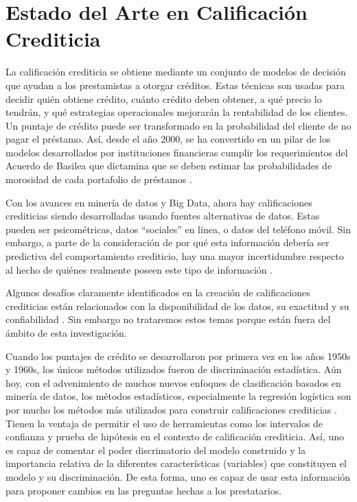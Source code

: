 \chapter{Estado del Arte en Calificación Crediticia}

La calificación crediticia se obtiene mediante un conjunto de modelos de decisión que ayudan a los prestamistas a otorgar créditos. Estas técnicas son usadas para decidir quién obtiene crédito, cuánto crédito deben obtener, a qué precio lo tendrán, y qué estrategias operacionales mejorarán la rentabilidad de los clientes. Un puntaje de crédito puede ser transformado en la probabilidad del cliente de no pagar el préstamo. Así, desde el año 2000, se ha convertido en un pilar de los modelos desarrollados por instituciones financieras cumplir los requerimientos del Acuerdo de Basilea que dictamina que se deben estimar las probabilidades de morosidad de cada portafolio de préstamos \cite[1]{thomas2017credit}.

Con los avances en minería de datos y Big Data, ahora hay calificaciones crediticias siendo desarrolladas usando fuentes alternativas de datos. Estas pueden ser psicométricas, datos ``sociales'' en línea, o datos del teléfono móvil. Sin embargo, a parte de la consideración de por qué esta información debería ser predictiva del comportamiento crediticio, hay una mayor incertidumbre respecto al hecho de quiénes realmente poseen este tipo de información \cite[18]{thomas2017credit}.

Algunos desafíos claramente identificados en la creación de calificaciones crediticias están relacionados con la disponibilidad de los datos, su exactitud y su confiabilidad \cite[18--19]{thomas2017credit}. Sin embargo no trataremos estos temas porque están fuera del ámbito de esta investigación.

Cuando los puntajes de crédito se desarrollaron por primera vez en los años 1950s y 1960s, los únicos métodos utilizados fueron de discriminación estadística. Aún hoy, con el advenimiento de muchos nuevos enfoques de clasificación basados en minería de datos, los métodos estadísticos, especialmente la regresión logística son por mucho los métodos más utilizados para construir calificaciones crediticias \cite[25]{thomas2017credit}. Tienen la ventaja de permitir el uso de herramientas como los intervalos de confianza y prueba de hipótesis en el contexto de calificación crediticia. Así, uno es capaz de comentar el poder discrimatorio del modelo construido y la importancia relativa de la diferentes características (variables) que constituyen el modelo y su discriminación. De esta forma, uno es capaz de usar esta información para proponer cambios en las preguntas hechas a los prestatarios.


